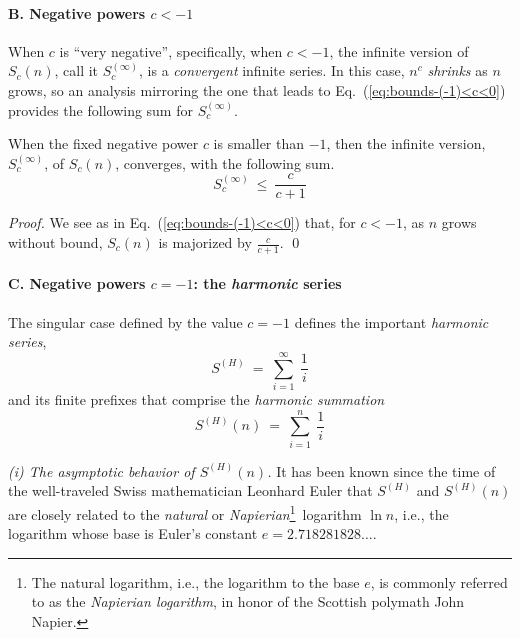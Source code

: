 \paragraph{B. Negative powers $c < -1$}

When $c$ is ``very negative'', specifically, when $c < -1$, the infinite version of $S_c(n)$, call it $S_c^{(\infty)}$, is a {\em convergent} infinite series.  In this case, $n^c$ {\em shrinks} as $n$ grows, so an analysis mirroring the one that leads to Eq.~(\ref{eq:bounds-(-1)<c<0}) provides the following sum for $S_c^{(\infty)}$.

\begin{prop}
\label{thm:bounds-negative-(not-1)-sum-xc}
When the fixed negative power $c$ is smaller than $-1$, then the infinite version, $S_c^{(\infty)}$, of $S_c(n)$, converges, with the following sum.
\begin{equation}
\label{eq:bounds-negative-(not-1)-sum-xc}
S_c^{(\infty)} \ \leq \ \frac{c}{c+1}
\end{equation}
\end{prop}

\begin{proof}
We see as in Eq.~(\ref{eq:bounds-(-1)<c<0}) that, for $c<-1$, as $n$ grows without bound, $S_c(n)$ is majorized by ${\displaystyle \frac{c}{c+1}}$.  \qed
\end{proof}

\paragraph{C. Negative powers $c = -1$: the {\em harmonic} series}

The singular case defined by the value $c = -1$ defines the important {\it harmonic series},
\[ S^{(H)} \ = \ \sum_{i=1}^\infty \ \frac{1}{i} \]
and its finite prefixes that comprise the {\it harmonic summation}
\[ S^{(H)}(n) \ = \ \sum_{i=1}^n \ \frac{1}{i} \]

\smallskip

 
 
{\it (i) The asymptotic behavior of $S^{(H)}(n)$.}
It has been known since the time of the well-traveled Swiss mathematician Leonhard Euler that $S^{(H)}$ and $S^{(H)}(n)$ are closely related to the {\em natural} or {\it Napierian}\footnote{The natural logarithm, i.e., the logarithm to the base $e$, is commonly referred to as the {\it Napierian logarithm}, in honor of the Scottish polymath John Napier.}~logarithm $\ln n$, i.e., the logarithm whose base is Euler's constant $e = 2.718281828 \ldots$.

